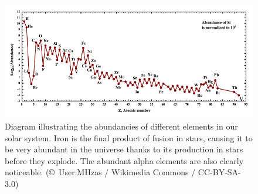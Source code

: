\documentclass[english, oneside]{HYgradu}
\begin{document}
\begin{figure}[h!tb]
\centering
\includegraphics[width=\textwidth]{../images/SolarSystemAbundances.pdf}
\caption{Diagram illustrating the abundancies of different elements in our solar system. Iron is the final product of fusion in stars, causing it to be very abundant in the universe thanks to its production in stars before they explode. The abundant alpha elements are also clearly noticeable.
(\copyright \ User:MHz\textasciigrave as / Wikimedia Commons / CC-BY-SA-3.0)}
\label{fig:IronPeak}
\end{figure}
\end{document}
